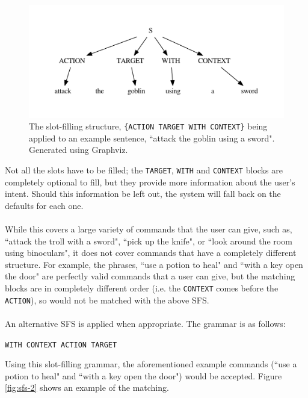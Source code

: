 \documentclass[11pt]{article}
\begin{document}
\begin{center}
\begin{figure}[H]
\begin{center}
  \includegraphics[width=\linewidth]{sfs-1.pdf}
  \caption{The slot-filling structure, \texttt{\{ACTION TARGET WITH CONTEXT\}} being applied to an example sentence, ``attack the goblin using a sword". Generated using Graphviz.}
  \label{fig:sfs-1}
  \end{center}
\end{figure}
\end{center}

Not all the slots have to be filled; the \texttt{TARGET}, \texttt{WITH} and \texttt{CONTEXT} blocks are completely optional to fill, but they provide more information about the user's intent. Should this information be left out, the system will fall back on the defaults for each one.
\\
\\
While this covers a large variety of commands that the user can give, such as, ``attack the troll with a sword", ``pick up the knife", or ``look around the room using binoculars", it does not cover commands that have a completely different structure. For example, the phrases, ``use a potion to heal" and ``with a key open the door" are perfectly valid commands that a user can give, but the matching blocks are in completely different order (i.e. the \texttt{CONTEXT} comes before the \texttt{ACTION}), so would not be matched with the above SFS.
\\
\\
An alternative SFS is applied when appropriate. The grammar is as follows:

\begin{center}
\texttt{WITH CONTEXT ACTION TARGET}
\end{center}

Using this slot-filling grammar, the aforementioned example commands (``use a potion to heal" and ``with a key open the door") would be accepted. Figure \ref{fig:sfs-2} shows an example of the matching.
\end{document}
